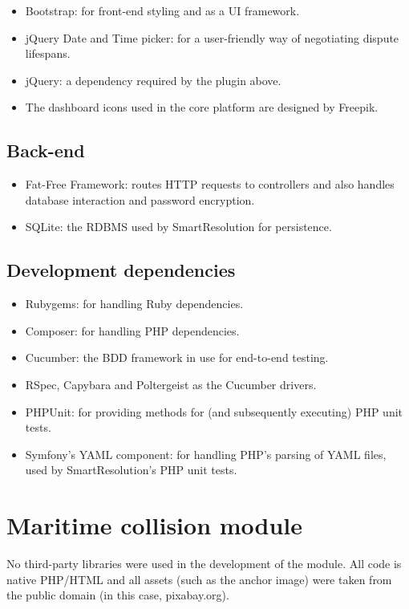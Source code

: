 \begin{itemize}
\item Bootstrap: for front-end styling and as a UI framework.
\item jQuery Date and Time picker: for a user-friendly way of negotiating dispute lifespans.
\item jQuery: a dependency required by the plugin above.
\item The dashboard icons used in the core platform are designed by Freepik.
\end{itemize}

\subsection{Back-end}

\begin{itemize}
\item Fat-Free Framework: routes HTTP requests to controllers and also handles database interaction and password encryption.
\item SQLite: the RDBMS used by SmartResolution for persistence.
\end{itemize}

\subsection{Development dependencies}

\begin{itemize}
\item Rubygems: for handling Ruby dependencies.
\item Composer: for handling PHP dependencies.
\item Cucumber: the BDD framework in use for end-to-end testing.
\item RSpec, Capybara and Poltergeist as the Cucumber drivers.
\item PHPUnit: for providing methods for (and subsequently executing) PHP unit tests.
\item Symfony's YAML component: for handling PHP's parsing of YAML files, used by SmartResolution's PHP unit tests.
\end{itemize}

\section{Maritime collision module}

No third-party libraries were used in the development of the module. All code is native PHP/HTML and all assets (such as the anchor image) were taken from the public domain (in this case, pixabay.org).

